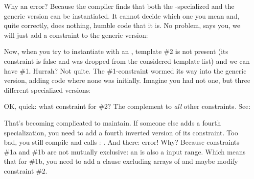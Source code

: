 
Why an error? Because the compiler finds that both the -specialized and the generic version can be instantiated. It cannot decide which one you mean and, quite correctly, does nothing, humble code that it is. No problem, says you, we will just add a constraint to the generic version:


Now, when you try to instantiate with an , template \#2 is not present (its constraint is false and was dropped from the considered template list) and we can have \#1. Hurrah? Not quite. The \#1-constraint wormed its way into the generic version, adding code where none was initially. Imagine you had not one, but three different specialized versions:


OK, quick: what constraint for \#2? The complement to \emph{all} other constraints. See:


That's becoming complicated to maintain. If someone else adds a fourth specialization, you need to add a fourth inverted version of its constraint. Too bad, you still compile and calls : \DD{[])}. And there: error! Why? Because constraints \#1a and \#1b are not mutually exclusive: an \DD{[]} is also a input range. Which means that for \#1b, you need to add a clause excluding arrays of  and maybe modify constraint \#2.

